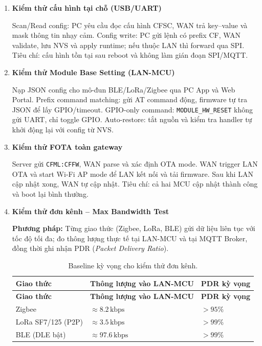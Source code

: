 \begin{enumerate}
            \item \textbf{Kiểm thử cấu hình tại chỗ (USB/UART)}
        
            Scan/Read config: PC yêu cầu đọc cấu hình CFSC, WAN trả key--value và mask thông tin nhạy cảm. Config write: PC gửi lệnh có prefix CF, WAN validate, lưu NVS và apply runtime; nếu thuộc LAN thì forward qua SPI. Tiêu chí: cấu hình tồn tại sau reboot và không làm gián đoạn SPI/MQTT.
        
            \item \textbf{Kiểm thử Module Base Setting (LAN-MCU)}
        
            Nạp JSON config cho mô-đun BLE/LoRa/Zigbee qua PC App và Web Portal. Prefix command matching: gửi AT command động, firmware tự tra JSON để lấy GPIO/timeout. GPIO-only command: \texttt{MODULE\_HW\_RESET} không gửi UART, chỉ toggle GPIO. Auto-restore: tắt nguồn và kiểm tra handler tự khởi động lại với config từ NVS.
        
            \item \textbf{Kiểm thử FOTA toàn gateway}
        
            Server gửi \texttt{CFML:CFFW}, WAN parse và xác định OTA mode. WAN trigger LAN OTA và start Wi-Fi AP mode để LAN kết nối và tải firmware. Sau khi LAN cập nhật xong, WAN tự cập nhật. Tiêu chí: cả hai MCU cập nhật thành công và boot lại bình thường.

            \item \textbf{Kiểm thử đơn kênh -- Max Bandwidth Test}

            \textbf{Phương pháp:} Từng giao thức (Zigbee, LoRa, BLE) gửi dữ liệu liên tục với tốc độ tối đa; đo thông lượng thực tế tại LAN-MCU và tại MQTT Broker, đồng thời ghi nhận PDR (\textit{Packet Delivery Ratio}).
            
            \begin{longtable}{|p{4cm}|p{5.5cm}|p{2.5cm}|}
                \caption{Baseline kỳ vọng cho kiểm thử đơn kênh.}
                \label{tab:single_channel_baseline} \\
                \hline
                \textbf{Giao thức} & \textbf{Thông lượng vào LAN-MCU} & \textbf{PDR kỳ vọng} \\ \hline
                \endfirsthead
                \hline
                \textbf{Giao thức} & \textbf{Thông lượng vào LAN-MCU} & \textbf{PDR kỳ vọng} \\ \hline
                \endhead
                \hline
                \endfoot
                \endlastfoot
                Zigbee & $\approx 8{.}2\,\text{kbps}$ & $> 95\%$ \\ \hline
                LoRa SF7/125 (P2P) & $\approx 3{.}5\,\text{kbps}$ & $> 99\%$ \\ \hline
                BLE (DLE bật) & $\approx 97{.}6\,\text{kbps}$ & $> 99\%$ \\ \hline
            \end{longtable}
            

\end{enumerate}
